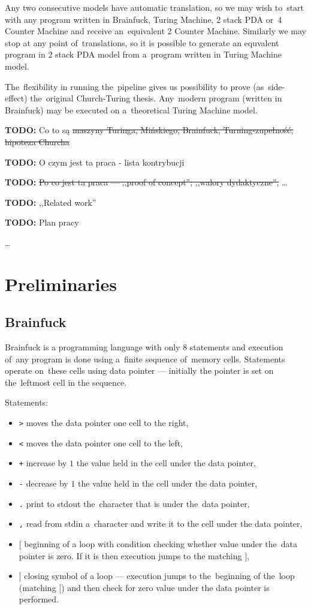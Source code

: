 \documentclass[english,shortabstract,mgr]{iithesis}
\newcommand{\todo}[1]{\textbf{TODO:} #1}
\begin{document}
Any two consecutive models have automatic translation, so we may wish to~start with any program written
in Brainfuck, Turing Machine, 2 stack PDA or~4 Counter Machine and receive an~equivalent 2 Counter Machine.
Similarly we may stop at any point of~translations, so it is possible to generate an equvalent program
in 2 stack PDA model from a~program written in Turing Machine model.

The~flexibility in running the~pipeline gives us possibility to prove (as~side-effect)
the~original Church-Turing thesis. Any~modern program (written in Brainfuck) may be executed
on a~theoretical Turing Machine model.


\todo{Co to są \sout{maszyny Turinga, Mińskiego, Brainfuck, Turning-zupełność, hipoteza Churcha}}

\todo{O czym jest ta praca - lista kontrybucji}

\todo{\sout{Po co jest ta praca --- ,,proof of concept''; ,,walory dydaktyczne'', }\dots}

\todo{,,Related work''}

\todo{Plan pracy}

\ldots

\chapter {Preliminaries}

\section {Brainfuck}

Brainfuck is a programming language with only $8$ statements and execution
of~any program is done using a~finite sequence of~memory cells. Statements
operate on~these cells using data pointer --- initially the pointer is set
on the~leftmost cell in the sequence.

Statements:
\begin{itemize}
  \item \texttt{>} moves the data pointer one cell to the right,
  \item \texttt{<} moves the data pointer one cell to the left,
  \item \texttt{+} increase by $1$ the value held in the cell under the data pointer,
  \item \texttt{-} decrease by $1$ the value held in the cell under the data pointer,
  \item \texttt{.} print to stdout the~character that is under the~data pointer,
  \item \texttt{,} read from stdin a~character and write it to the cell under the data pointer,
  \item \texttt{$[$} beginning of a loop with condition checking whether value under
      the~data pointer is zero. If it is then execution jumps to the matching $]$,
  \item \texttt{$]$} closing symbol of a loop --- execution jumps to the~beginning of the~loop
      (matching $[$) and then check for zero value under the data pointer is performed.
\end{itemize}
\end{document}
